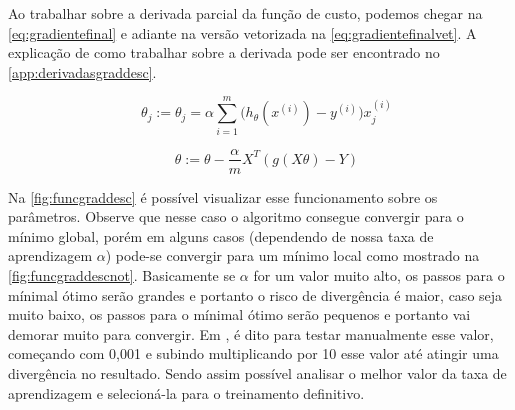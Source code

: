 Ao trabalhar sobre a derivada parcial da função de custo, podemos chegar na \autoref{eq:gradientefinal} e adiante na versão vetorizada na \autoref{eq:gradientefinalvet}. A explicação de como trabalhar sobre a derivada pode ser encontrado no \autoref{app:derivadasgraddesc}.

\begin{equation}
\quad \theta_j := \theta_j = \alpha \sum\limits_{i=1}^{m}\Big(h_{\theta}(x^{(i)}) - y^{(i)} \Big) x_j^{(i)} \label{eq:gradientefinal}
\end{equation}

\begin{equation}
\quad \theta := \theta - \frac{\alpha}{m}X^T(g(X\theta) - Y) \label{eq:gradientefinalvet}
\end{equation}

Na \autoref{fig:funcgraddesc} é possível visualizar esse funcionamento sobre os parâmetros. Observe que nesse caso o algoritmo consegue convergir para o mínimo global, porém em alguns casos (dependendo de nossa taxa de aprendizagem $ \alpha $) pode-se convergir para um mínimo local como mostrado na \autoref{fig:funcgraddescnot}. Basicamente se $\alpha$ for um valor muito alto, os passos para o mínimal ótimo serão grandes e portanto o risco de divergência é maior, caso seja muito baixo, os passos para o mínimal ótimo serão pequenos e portanto vai demorar muito para convergir. Em \cite{machinelearningcoursera}, é dito para testar manualmente esse valor, começando com 0,001 e subindo multiplicando por 10 esse valor até atingir uma divergência no resultado. Sendo assim possível analisar o melhor valor da taxa de aprendizagem e selecioná-la para o treinamento definitivo.

